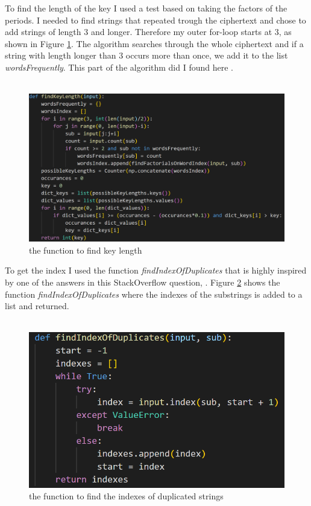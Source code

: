 \documentclass[12pt, letterpaper]{article}
\begin{document}
To find the length of the key I used a test based on taking the factors of the periods. I needed to find strings that repeated trough the ciphertext and chose to add strings of length 3 and longer. Therefore my outer for-loop starts at 3, as shown in Figure \ref{fig:findKeyLength}. The algorithm searches through the whole ciphertext and if a string with length longer than 3 occurs more than once, we add it to the list \textit{wordsFrequently}. This part of the algorithm did I found here \cite{SE}.
\\ \\
\begin{figure}[H]
  \includegraphics[width=\linewidth]{code_snippets/findKeyLength.PNG}
  \caption{the function to find key length}
  \label{fig:findKeyLength}
\end{figure}

To get the index I used the function \textit{findIndexOfDuplicates} that is highly inspired by one of the answers in this StackOverflow question, \cite{SO}. Figure \ref{fig:findIndexOfDuplicates} shows the function \textit{findIndexOfDuplicates} where the indexes of the substrings is added to a list and returned. \\ \\

\begin{figure}[H]
  \includegraphics[width=\linewidth]{code_snippets/findIndexOfDuplicates.PNG}
  \caption{the function to find the indexes of duplicated strings}
  \label{fig:findIndexOfDuplicates}
\end{figure}
\end{document}
